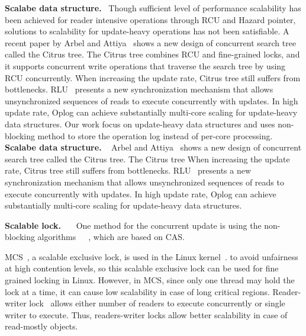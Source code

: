 \ifkor
\noindent
\textbf{Scalabe data structure.}
~\cite{Dodds2015SCT}Though sufficient level of performance scalability has been
achieved for reader intensive operations through RCU and Hazard pointer, 
solutions to scalability for update-heavy operations has not been satisfiable.
A recent paper by Arbel and Attiya~\cite{Arbel2014ConcurrentRCU} shows a new
design of concurrent search tree called the Citrus tree. The Citrus tree
combines RCU and fine-grained locks, and it supports concurrent write
operations that traverse the search tree by using RCU concurrently.
When increasing the update rate, Citrus tree still suffers from bottlenecks.
RLU~\cite{Matveev2015RLU} presents a new synchronization mechanism that allows
unsynchronized sequences of reads to execute concurrently with updates.
In high update rate, Oplog can achieve substantially multi-core scaling for
update-heavy data structures.
Our work focus on update-heavy data structures and uses non-blocking method to
 store the operation log instead of per-core processing.
\else
\noindent
\textbf{Scalabe data structure.}
~\cite{Dodds2015SCT} Arbel and Attiya~\cite{Arbel2014ConcurrentRCU} shows a new
design of concurrent search tree called the Citrus tree. The Citrus tree
When increasing the update rate, Citrus tree still suffers from bottlenecks.
RLU~\cite{Matveev2015RLU} presents a new synchronization mechanism that allows
unsynchronized sequences of reads to execute concurrently with updates.
In high update rate, Oplog can achieve substantially multi-core scaling for
update-heavy data structures.
\fi



\ifkor
\noindent
\textbf{Scalable lock.}
~\cite{Wang2016BeMyGuest}~\cite{Bueso2015STP}~\cite{Bueso2014MCS}One method for
the concurrent update is using the non-blocking algorithms~\cite{Harris2001Lockfree}~\cite{Fomitchev2004Lockfree}~\cite{Timnat2012},
 which are based on CAS.


MCS~\cite{MellorCrummey91}, a scalable exclusive lock, is used in the Linux
kernel~\cite{MCSLocksKernel}.
to avoid unfairness at high contention levels, so this scalable exclusive
lock can be used for fine grained locking in Linux. 
However, in MCS, since only one thread may hold the lock at a time, it can
cause low scalability in case of long critical regions.
Reader-writer lock~\cite{Courtois71} allows either number of readers to execute
concurrently or single writer to execute.
Thus, readers-writer locks allow better scalability in case of read-mostly 
objects.

